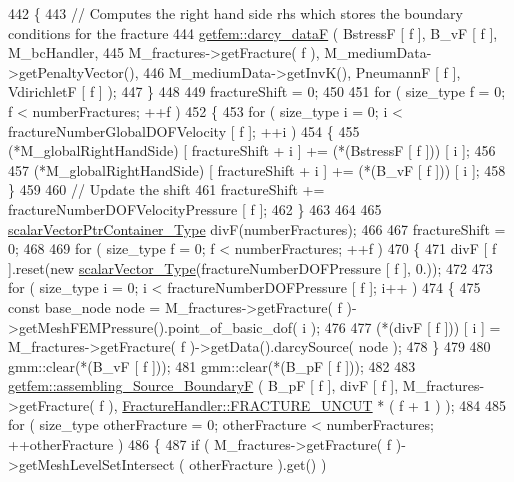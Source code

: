 \begin{DoxyCode}
442     \{
443         \textcolor{comment}{// Computes the right hand side rhs which stores the boundary conditions for the fracture}
444         \hyperlink{namespacegetfem_ad6e90b309c01f6b4fc91c9369cba376a}{getfem::darcy\_dataF} ( BstressF [ f ], B\_vF [ f ], M\_bcHandler,
445                               M\_fractures->getFracture( f ), M\_mediumData->getPenaltyVector(),
446                               M\_mediumData->getInvK(), PneumannF [ f ], VdirichletF [ f ] );
447     \}
448 
449     fractureShift = 0;
450     
451     \textcolor{keywordflow}{for} ( size\_type f = 0; f < numberFractures; ++f )
452     \{   
453         \textcolor{keywordflow}{for} ( size\_type i = 0; i < fractureNumberGlobalDOFVelocity [ f ]; ++i )
454         \{   
455             (*M\_globalRightHandSide) [ fractureShift + i ] += (*(BstressF [ f ])) [ i ];
456 
457             (*M\_globalRightHandSide) [ fractureShift + i ] += (*(B\_vF [ f ])) [ i ];
458         \}
459 
460         \textcolor{comment}{// Update the shift}
461         fractureShift += fractureNumberDOFVelocityPressure [ f ];
462     \}
463 
464 
465     \hyperlink{Core_8h_a20f0354ac7b92989514c678f4cdfcb6b}{scalarVectorPtrContainer\_Type} divF(numberFractures);
466 
467     fractureShift = 0;
468     
469     \textcolor{keywordflow}{for} ( size\_type f = 0; f < numberFractures; ++f )
470     \{
471         divF [ f ].reset(\textcolor{keyword}{new} \hyperlink{Core_8h_a4e75b5863535ba1dd79942de2846eff0}{scalarVector\_Type}(fractureNumberDOFPressure [ f ], 0.));
472 
473         \textcolor{keywordflow}{for} ( size\_type i = 0; i < fractureNumberDOFPressure [ f ]; i++ )
474         \{
475             \textcolor{keyword}{const} base\_node node = M\_fractures->getFracture( f )->getMeshFEMPressure().point\_of\_basic\_dof( 
      i );
476 
477             (*(divF [ f ])) [ i ] = M\_fractures->getFracture( f )->getData().darcySource( node );
478         \}
479 
480         gmm::clear(*(B\_vF [ f ]));
481         gmm::clear(*(B\_pF [ f ]));
482 
483         \hyperlink{namespacegetfem_ac08fe08fb325eede94ffe4968b7980de}{getfem::assembling\_Source\_BoundaryF} ( B\_pF [ f ], divF [ f ], 
      M\_fractures->getFracture( f ), \hyperlink{classFractureHandler_a495ad4fc72d0c47c8f0424842f1153aaaa992cc3ad024a030ecd798dc319c95ac}{FractureHandler::FRACTURE\_UNCUT} * ( f + 1 ) );
484 
485         \textcolor{keywordflow}{for} ( size\_type otherFracture = 0; otherFracture < numberFractures; ++otherFracture )
486         \{
487             \textcolor{keywordflow}{if} ( M\_fractures->getFracture( f )->getMeshLevelSetIntersect ( otherFracture ).get() )

\end{DoxyCode}
